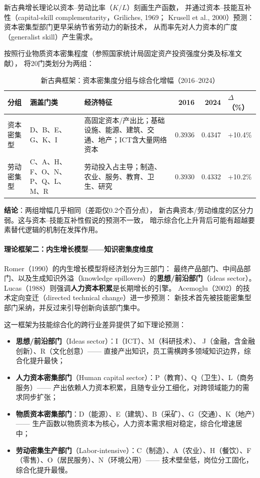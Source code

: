 \documentclass[12pt,a4paper]{ctexart}
\begin{document}
新古典增长理论以资本--劳动比率（$K/L$）刻画生产函数，
并通过资本--技能互补性（capital-skill complementarity，Griliches, 1969；
Krusell et al., 2000）预测：资本密集型部门更早采纳节省劳动力的新技术，
从而率先对人力资本的广度（generalist skill）产生需求。

按照行业物质资本密集程度（参照国家统计局固定资产投资强度分类及标准文献），
将20门类划分为两组：

\begin{table}[H]
\centering
\caption{新古典框架：资本密集度分组与综合化增幅（2016--2024）}
\begin{tabular}{llp{5.5cm}rrl}
\toprule
分组 & 涵盖门类 & 经济特征 & 2016 & 2024 & $\Delta$（\%） \\
\midrule
资本密集型 & D、B、E、G、K、I &
  高固定资本/产出比；基础设施、能源、建筑、交通、地产；ICT含大量网络资本 &
  0.3936 & 0.4347 & +10.4\% \\
劳动密集型 & C、A、H、F、O、N、P、Q、L、M、R &
  劳动投入占主导；制造、农业、服务、教育、卫生、研究 &
  0.3930 & 0.4332 & +10.2\% \\
\bottomrule
\end{tabular}
\end{table}

\textbf{结论}：两组增幅几乎相同（差距仅0.2个百分点），
新古典资本/劳动维度的区分力弱。这与资本--技能互补性假说的预测不一致，
暗示综合化上升背后可能有超越要素替代逻辑的机制在发挥作用。

\paragraph{理论框架二：内生增长模型——知识密集度维度}

Romer（1990）的内生增长模型将经济划分为三部门：
最终产品部门、中间品部门、以及生成知识外溢（knowledge spillovers）的\textbf{思想/前沿部门}（ideas sector）。
Lucas（1988）则强调\textbf{人力资本积累}是长期增长的引擎。
Acemoglu（2002）的技术定向变迁（directed technical change）进一步预测：
新技术首先被技能密集型部门采纳，并反过来引导创新向该部门集中。

这一框架为技能综合化的跨行业差异提供了如下理论预测：
\begin{itemize}
    \item \textbf{思想/前沿部门}（Ideas sector）：I（ICT）、M（科研技术）、
    J（金融，含金融创新）、R（文化创意）——
    直接产出知识，员工需横跨多领域知识边界，综合化提升最快；
    \item \textbf{人力资本密集部门}（Human capital sector）：P（教育）、Q（卫生）、L（商务服务）——
    产出依赖人力资本积累，且随专业分工细化，对跨领域能力的需求同步扩张；
    \item \textbf{物质资本密集部门}：D（能源）、E（建筑）、B（采矿）、G（交通）、K（地产）——
    生产函数以物质资本为核心，人力资本需求相对稳定，综合化增速居中；
    \item \textbf{劳动密集生产部门}（Labor-intensive）：C（制造）、A（农业）、H（餐饮）、F（零售）、O（居民服务）、N（环境公用）——
    技术壁垒低，岗位分工固化，综合化提升最慢。
\end{itemize}
\end{document}

